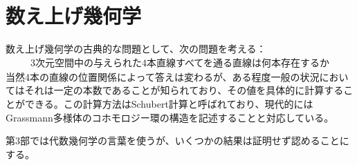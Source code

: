 \documentclass{ltjsreport}
\begin{document}
  \chapter{数え上げ幾何学}

  数え上げ幾何学の古典的な問題として、次の問題を考える：
  \begin{align*}
    \text{3次元空間中の与えられた4本直線すべてを通る直線は何本存在するか}
  \end{align*}
  当然4本の直線の位置関係によって答えは変わるが、ある程度一般の状況においてはそれは一定の本数であることが知られており、その値を具体的に計算することができる。この計算方法はSchubert計算と呼ばれており、現代的にはGrassmann多様体のコホモロジー環の構造を記述することと対応している。

  第3部では代数幾何学の言葉を使うが、いくつかの結果は証明せず認めることにする。

  

  
\end{document}
